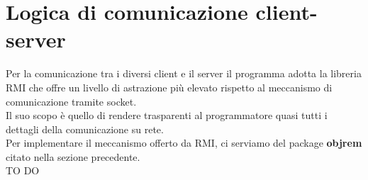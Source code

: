 % 
%
%

\section{Logica di comunicazione client-server} %
\label{sec:logica_di_comunicazione_client_server}
Per la comunicazione tra i diversi client e il server il programma adotta la libreria RMI che offre un livello di astrazione più elevato rispetto al meccanismo di comunicazione tramite socket. \\
Il suo scopo è quello di rendere trasparenti al programmatore quasi tutti i dettagli della comunicazione su rete. \\
Per implementare il meccanismo offerto da RMI, ci serviamo del package \textbf{objrem} citato nella sezione precedente. \\
TO DO




